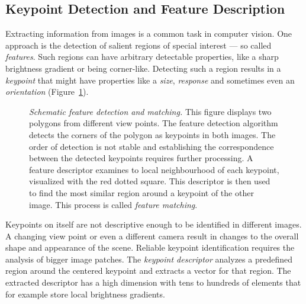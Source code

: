 \subsection{Keypoint Detection and Feature Description}

Extracting information from images is a common task in computer vision.
One approach is the detection of salient regions of special interest --- so called \emph{features}.
Such regions can have arbitrary detectable properties, like a sharp brightness gradient or being corner-like.
Detecting such a region results in a \emph{keypoint} that might have properties like a \emph{size}, \emph{response} and sometimes even an \emph{orientation} (Figure~\ref{fig:features_example}).
\begin{figure}[b!]
    \scalebox{0.95}{%
    
    }
    \caption[Schematic feature detection and matching]{\emph{Schematic feature detection and matching.} This figure displays two polygons from different view points. The feature detection algorithm detects the corners of the polygon as keypoints in both images. The order of detection is not stable and establishing the correspondence between the detected keypoints requires further processing. A feature descriptor examines to local neighbourhood of each keypoint, visualized with the red dotted square. This descriptor is then used to find the most similar region around a keypoint of the other image. This process is called \emph{feature matching}.}\label{fig:features_example}
\end{figure}
Keypoints on itself are not descriptive enough to be identified in different images.
A changing view point or even a different camera result in changes to the overall shape and appearance of the scene.
Reliable keypoint identification requires the analysis of bigger image patches.
The \emph{keypoint descriptor} analyzes a predefined region around the centered keypoint and extracts a vector for that region.
The extracted descriptor has a high dimension with tens to hundreds of elements that for example store local brightness gradients.

